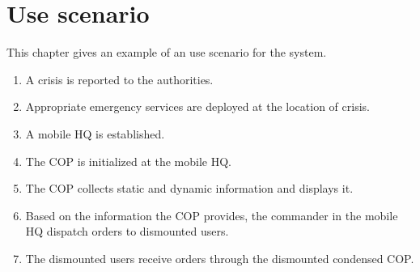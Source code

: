 \chapter{Use scenario}
This chapter gives an example of an use scenario for the system.

\begin{enumerate}
\item A crisis is reported to the authorities. 
\item Appropriate emergency services are deployed at the location of crisis.
\item A mobile HQ is established.
\item The COP is initialized at the mobile HQ.
\item The COP collects static and dynamic information and displays it.  
\item Based on the information the COP provides, the commander in the mobile HQ dispatch orders to dismounted users.
\item The dismounted users receive orders through the dismounted condensed COP. 

\end{enumerate}